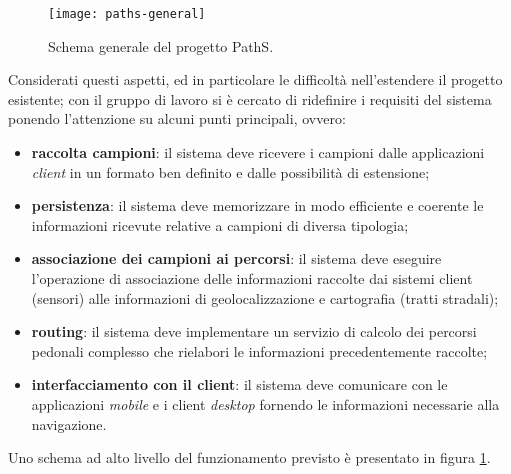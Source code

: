 \begin{figure}[ht]
  \centering
  \texttt{[image: paths-general]}
  \caption{\footnotesize{Schema generale del progetto PathS.}}
  \label{fig:paths-general}
\end{figure}

Considerati questi aspetti, ed in particolare le difficoltà nell'estendere il progetto esistente;  con il gruppo di lavoro si è cercato di ridefinire i requisiti del sistema ponendo l'attenzione su alcuni punti principali, ovvero:
\begin{itemize}
\item \textbf{raccolta campioni}: il sistema deve ricevere i campioni dalle applicazioni \emph{client} in un formato ben definito e dalle possibilità di estensione;
\item \textbf{persistenza}: il sistema deve memorizzare in modo efficiente e coerente le informazioni ricevute relative a campioni di diversa tipologia;
\item \textbf{associazione dei campioni ai percorsi}: il sistema deve eseguire l'operazione di associazione delle informazioni raccolte dai sistemi client (sensori) alle informazioni di geolocalizzazione e cartografia (tratti stradali);
\item \textbf{routing}: il sistema deve implementare un servizio di calcolo dei percorsi pedonali complesso che rielabori le informazioni precedentemente raccolte;
\item \textbf{interfacciamento con il client}: il sistema deve comunicare con le applicazioni \emph{mobile}  e i client \emph{desktop} fornendo le informazioni necessarie alla navigazione.
\end{itemize}

Uno schema ad alto livello del funzionamento previsto è presentato in figura \ref{fig:paths-general}.

